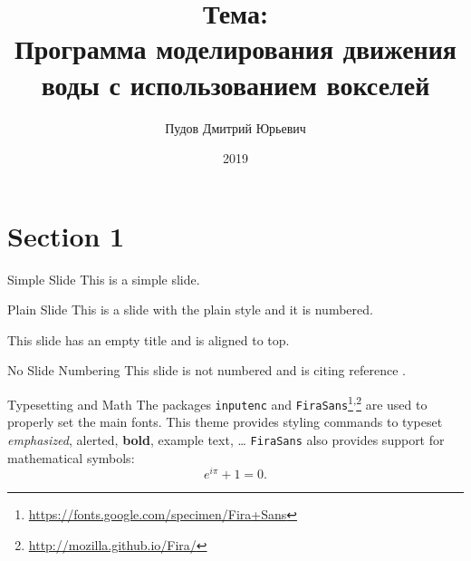 \documentclass{beamer}
\title{Тема: \\ Программа моделирования движения воды с использованием вокселей}
\author{Пудов Дмитрий Юрьевич}
\institute{МГТУ им. Н.Э. Баумана \\ Москва}
\date{2019}
\begin{document}

\begin{frame}
	\maketitle %
\end{frame}


\section{Section 1} %


\begin{frame}{Simple Slide}
	This is a simple slide.
\end{frame}


\begin{frame}[plain]{Plain Slide}
	This is a slide with the plain style and it is numbered.
\end{frame}


\begin{frame}[t]
	This slide has an empty title and is aligned to top.
\end{frame}


\begin{frame}[noframenumbering]{No Slide Numbering}
	This slide is not numbered and is citing reference \cite{knuth74}.
\end{frame}


\begin{frame}{Typesetting and Math}
	The packages \texttt{inputenc} and \texttt{FiraSans}\footnote{\url{https://fonts.google.com/specimen/Fira+Sans}}\textsuperscript{,}\footnote{\url{http://mozilla.github.io/Fira/}} are used to properly set the main fonts.
	\vfill
	This theme provides styling commands to typeset \emph{emphasized}, \alert{alerted}, \textbf{bold}, \textcolor{example}{example text}, \dots
	\vfill
	\texttt{FiraSans} also provides support for mathematical symbols:
	\begin{equation*}
		e^{i\pi} + 1 = 0.
	\end{equation*}
\end{frame}
\end{document}
